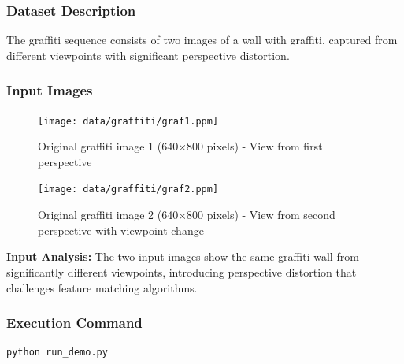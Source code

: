 \documentclass[12pt,a4paper]{article}
\begin{document}
\subsubsection{Dataset Description}
The graffiti sequence consists of two images of a wall with graffiti, captured from different viewpoints with significant perspective distortion.

\subsubsection{Input Images}

\begin{figure}[H]
\centering
\texttt{[image: data/graffiti/graf1.ppm]}
\caption{Original graffiti image 1 (640×800 pixels) - View from first perspective}
\label{fig:graf1_input}
\end{figure}

\begin{figure}[H]
\centering
\texttt{[image: data/graffiti/graf2.ppm]}
\caption{Original graffiti image 2 (640×800 pixels) - View from second perspective with viewpoint change}
\label{fig:graf2_input}
\end{figure}

\textbf{Input Analysis:} The two input images show the same graffiti wall from significantly different viewpoints, introducing perspective distortion that challenges feature matching algorithms.

\subsubsection{Execution Command}
\begin{lstlisting}[language=bash]
python run_demo.py
\end{lstlisting}
\end{document}
